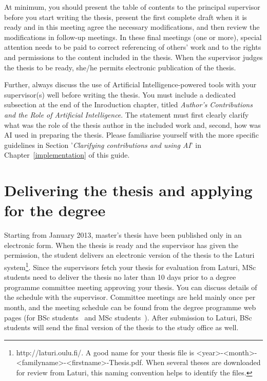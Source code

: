 At minimum, you should present the table of contents to the principal supervisor before you start writing the thesis, present the first complete draft when it is ready and in this meeting agree the necessary modifications, and then review the modifications in follow-up meetings. In these final meetings (one or more), special attention needs to be paid to correct referencing of others’ work and to the rights and permissions to the content included in the thesis. When the supervisor judges the thesis to be ready, she/he permits electronic publication of the thesis.

Further, always discuss the use of Artificial Intelligence-powered tools with your supervisor(s) well before writing the thesis. You must include a dedicated subsection at the end of the Inroduction chapter, titled \textit{Author's Contributions and the Role of Artificial Intelligence}. The statement must first clearly clarify what was the role of the thesis author in the included work and, second, how was AI used in preparing the thesis. Please familiarise yourself with the more specific guidelines in Section '\textit{Clarifying contributions and using AI}' in Chapter~\ref{implementation} of this guide.

\section{Delivering the thesis and applying for the degree}

Starting from January 2013, master’s thesis have been published only in an electronic form. When the thesis is ready and the supervisor has given the permission, the student delivers an electronic version of the thesis to the Laturi system\footnote{http://laturi.oulu.fi/. A good name for your thesis file is <year>-<month>-<familyname>-<firstname>-Thesis.pdf. When several theses are downloaded for review from Laturi, this naming convention helps to identify the files.}. Since the supervisors fetch your thesis for evaluation from Laturi, MSc students need to deliver the thesis no later than 10 days prior to a degree programme committee meeting approving your thesis. You can discuss details of the schedule with the supervisor. Committee meetings are held mainly once per month, and the meeting schedule can be found from the degree programme web pages (for BSc students~\cite{bscstudies} and MSc students~\cite{mscstudies}). After submission to Laturi, BSc students will send the final version of the thesis to the study office as well.

